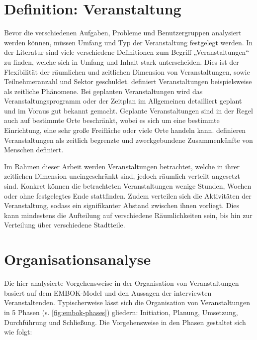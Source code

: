 \section{Definition: Veranstaltung} \label{sec:analysis-def}

Bevor die verschiedenen Aufgaben, Probleme und Benutzergruppen analysiert werden
können, müssen Umfang und Typ der Veranstaltung festgelegt werden. In der
Literatur sind viele verschiedene Definitionen zum Begriff „Veranstaltungen“ zu
finden, welche sich in Umfang und Inhalt stark unterscheiden. Dies ist der
Flexibilität der räumlichen und zeitlichen Dimension von Veranstaltungen, sowie
Teilnehmeranzahl und Sektor geschuldet. \textcite{Getz2007} definiert
Veranstaltungen beispielsweise als zeitliche Phänomene. Bei geplanten
Veranstaltungen wird das Veranstaltungsprogramm oder der Zeitplan im Allgemeinen
detailliert geplant und im Voraus gut bekannt gemacht. Geplante Veranstaltungen
sind in der Regel auch auf bestimmte Orte beschränkt, wobei es sich um eine
bestimmte Einrichtung, eine sehr große Freifläche oder viele Orte handeln kann.
\textcite{Bladen2017} definieren Veranstaltungen als zeitlich begrenzte und
zweckgebundene Zusammenkünfte von Menschen definiert.

Im Rahmen dieser Arbeit werden Veranstaltungen betrachtet, welche in ihrer
zeitlichen Dimension uneingeschränkt sind, jedoch räumlich verteilt angesetzt
sind. Konkret können die betrachteten Veranstaltungen wenige Stunden, Wochen
oder ohne festgelegtes Ende stattfinden. Zudem verteilen sich die Aktivitäten
der Veranstaltung, sodass ein signifikanter Abstand zwischen ihnen vorliegt.
Dies kann mindestens die Aufteilung auf verschiedene Räumlichkeiten sein, bis
hin zur Verteilung über verschiedene Stadtteile.


\section{Organisationsanalyse} \label{sec:analysis-org}

Die hier analysierte Vorgehensweise in der Organisation von Veranstaltungen
basiert auf dem EMBOK-Model \cite{Silvers2013} und den Aussagen der interviewten
Veranstaltenden. Typischerweise lässt sich die Organisation von Veranstaltungen
in 5 Phasen (s. \autoref{fig:embok-phases}) gliedern: Initiation, Planung,
Umsetzung, Durchführung und Schließung. Die Vorgehensweise in den Phasen
gestaltet sich wie folgt:

